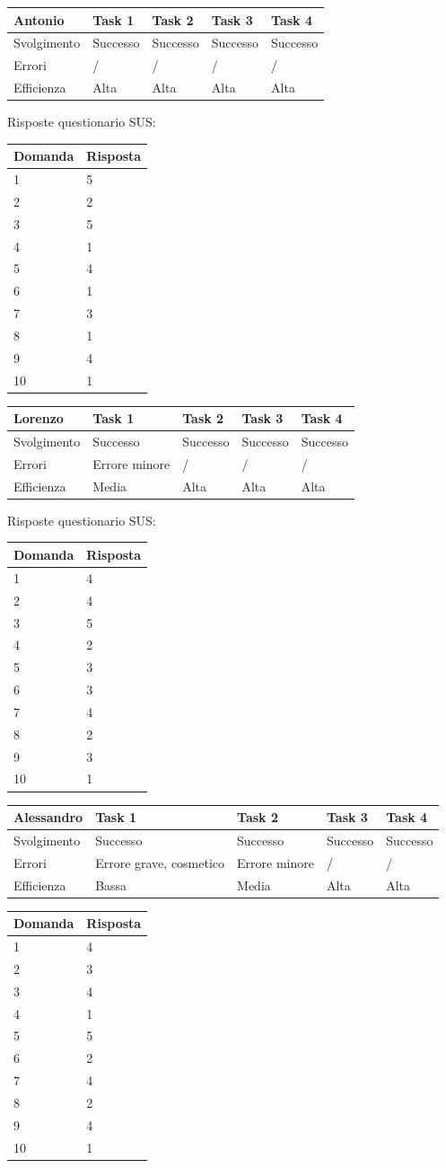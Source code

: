 \documentclass[12pt,italian,]{report}
\begin{document}
\begin{longtable}[]{@{}lllll@{}}
\toprule
Antonio & Task 1 & Task 2 & Task 3 & Task 4\tabularnewline
\midrule
\endhead
Svolgimento & Successo & Successo & Successo & Successo\tabularnewline
Errori & / & / & / & /\tabularnewline
Efficienza & Alta & Alta & Alta & Alta\tabularnewline
\bottomrule
\end{longtable}

Risposte questionario SUS:

\begin{longtable}[]{@{}ll@{}}
\toprule
Domanda & Risposta\tabularnewline
\midrule
\endhead
1 & 5\tabularnewline
2 & 2\tabularnewline
3 & 5\tabularnewline
4 & 1\tabularnewline
5 & 4\tabularnewline
6 & 1\tabularnewline
7 & 3\tabularnewline
8 & 1\tabularnewline
9 & 4\tabularnewline
10 & 1\tabularnewline
\bottomrule
\end{longtable}

\begin{longtable}[]{@{}lllll@{}}
\toprule
Lorenzo & Task 1 & Task 2 & Task 3 & Task 4\tabularnewline
\midrule
\endhead
Svolgimento & Successo & Successo & Successo & Successo\tabularnewline
Errori & Errore minore & / & / & /\tabularnewline
Efficienza & Media & Alta & Alta & Alta\tabularnewline
\bottomrule
\end{longtable}

Risposte questionario SUS:

\begin{longtable}[]{@{}ll@{}}
\toprule
Domanda & Risposta\tabularnewline
\midrule
\endhead
1 & 4\tabularnewline
2 & 4\tabularnewline
3 & 5\tabularnewline
4 & 2\tabularnewline
5 & 3\tabularnewline
6 & 3\tabularnewline
7 & 4\tabularnewline
8 & 2\tabularnewline
9 & 3\tabularnewline
10 & 1\tabularnewline
\bottomrule
\end{longtable}

\begin{longtable}[]{@{}lllll@{}}
\toprule
Alessandro & Task 1 & Task 2 & Task 3 & Task 4\tabularnewline
\midrule
\endhead
Svolgimento & Successo & Successo & Successo & Successo\tabularnewline
Errori & Errore grave, cosmetico & Errore minore & / & /\tabularnewline
Efficienza & Bassa & Media & Alta & Alta\tabularnewline
\bottomrule
\end{longtable}

\begin{longtable}[]{@{}ll@{}}
\toprule
Domanda & Risposta\tabularnewline
\midrule
\endhead
1 & 4\tabularnewline
2 & 3\tabularnewline
3 & 4\tabularnewline
4 & 1\tabularnewline
5 & 5\tabularnewline
6 & 2\tabularnewline
7 & 4\tabularnewline
8 & 2\tabularnewline
9 & 4\tabularnewline
10 & 1\tabularnewline
\bottomrule
\end{longtable}
\end{document}
